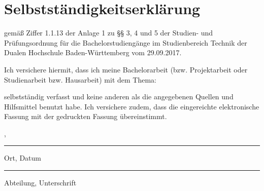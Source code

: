 \thispagestyle{empty}
\section*{\Huge{Selbstständigkeitserklärung}}

gemäß Ziffer 1.1.13 der Anlage 1 zu §§ 3, 4 und 5  der Studien- und Prüfungsordnung für die Bachelorstudiengänge im Studienbereich Technik der Dualen Hochschule Baden-Würt­tem­berg vom 29.09.2017.

\noindent Ich versichere hiermit, dass ich meine Bachelorarbeit (bzw. Projektarbeit oder Studienarbeit bzw. Hausarbeit) mit dem Thema: 
\begin{center}
	\Large\textbf{\vTitel}
\end{center}
selbstständig verfasst und keine anderen als die angegebenen Quellen und Hilfsmittel benutzt habe. Ich versichere zudem, dass die eingereichte elektronische Fassung mit der gedruckten Fassung übereinstimmt.

\vfill
\leavevmode
\newline
\parbox{6cm}{\centering \vBearbeitungsort, \vAbgabedatum\hrule\strut\centering\footnotesize Ort, Datum} 
\hfill
\parbox{6cm}{\hspace{1pt} \vAbteilung\hrule\strut\centering\footnotesize Abteilung, Unterschrift}

\newpage